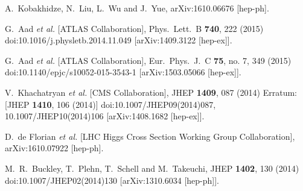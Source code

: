 \documentclass[twocolumn,prd,noshowpacs,nofootinbib,amsmath,amssymb,superscriptaddress,preprintnumbers]{revtex4}
\begin{document}
\begin{thebibliography}{99}
  A.~Kobakhidze, N.~Liu, L.~Wu and J.~Yue,
  arXiv:1610.06676 [hep-ph].


  G.~Aad {\it et al.} [ATLAS Collaboration],
  Phys.\ Lett.\ B {\bf 740}, 222 (2015)
  doi:10.1016/j.physletb.2014.11.049
  [arXiv:1409.3122 [hep-ex]].

  G.~Aad {\it et al.} [ATLAS Collaboration],
  Eur.\ Phys.\ J.\ C {\bf 75}, no. 7, 349 (2015)
  doi:10.1140/epjc/s10052-015-3543-1
  [arXiv:1503.05066 [hep-ex]].

  V.~Khachatryan {\it et al.} [CMS Collaboration],
  JHEP {\bf 1409}, 087 (2014)
  Erratum: [JHEP {\bf 1410}, 106 (2014)]
  doi:10.1007/JHEP09(2014)087, 10.1007/JHEP10(2014)106
  [arXiv:1408.1682 [hep-ex]].

  D.~de Florian {\it et al.} [LHC Higgs Cross Section Working Group Collaboration],
  arXiv:1610.07922 [hep-ph].




  M.~R.~Buckley, T.~Plehn, T.~Schell and M.~Takeuchi,
  JHEP {\bf 1402}, 130 (2014)
  doi:10.1007/JHEP02(2014)130
  [arXiv:1310.6034 [hep-ph]].



\end{thebibliography}
\end{document}
